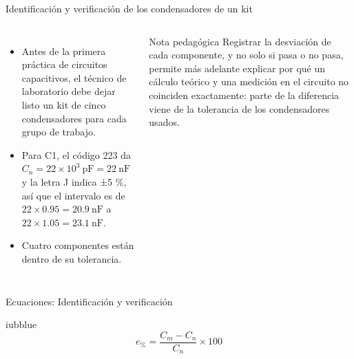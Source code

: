 \documentclass[aspectratio=169,11pt,xcolor={table}]{beamer}
\begin{document}
\begin{frame}{{\normalsize Identificación y verificación de los condensadores de un kit}}
\begin{columns}[c,onlytextwidth]
\small
\begin{itemize}\setlength{\itemsep}{4pt}
  \item Antes de la primera práctica de circuitos capacitivos, el técnico de laboratorio debe dejar listo un kit de cinco condensadores para cada grupo de trabajo.
  \item Para C1, el código 223 da $C_n = 22 \times 10^3\ \text{pF} = 22\ \text{nF}$ y la letra J indica ±5 \%, así que el intervalo es de $22 \times 0.95 = 20.9\ \text{nF}$ a $22 \times 1.05 = 23.1\ \text{nF}$.
  \item Cuatro componentes están dentro de su tolerancia.
\end{itemize}
\begin{cardO}{Nota pedagógica}
\footnotesize Registrar la desviación de cada componente, y no solo si pasa o no pasa, permite más adelante explicar por qué un cálculo teórico y una medición en el circuito no coinciden exactamente: parte de la diferencia viene de la tolerancia de los condensadores usados.
\end{cardO}
\end{columns}
\end{frame}

\begin{frame}{Ecuaciones: Identificación y verificación}
\begin{cajaplana}{iubblue}
\centering
{\large
\begin{equation*}
  e_{\text{\%}} = \frac{C_{m} - C_{n}}{C_{n}} \times 100
\end{equation*}
}
\end{cajaplana}
\end{frame}
\end{document}
